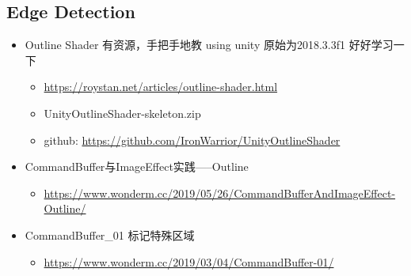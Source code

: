 \documentclass[9pt, b5paper]{article}
\begin{document}
\subsection{Edge Detection}
\label{sec-2-6}
\begin{itemize}
\item Outline Shader 有资源，手把手地教 using unity 原始为2018.3.3f1 好好学习一下
\begin{itemize}
\item \url{https://roystan.net/articles/outline-shader.html}
\item UnityOutlineShader-skeleton.zip
\item github: \url{https://github.com/IronWarrior/UnityOutlineShader}
\end{itemize}
\item CommandBuffer与ImageEffect实践-----Outline
\begin{itemize}
\item \url{https://www.wonderm.cc/2019/05/26/CommandBufferAndImageEffect-Outline/}
\end{itemize}
\item CommandBuffer\_01 标记特殊区域
\begin{itemize}
\item \url{https://www.wonderm.cc/2019/03/04/CommandBuffer-01/}
\end{itemize}


\end{itemize}
\end{document}
